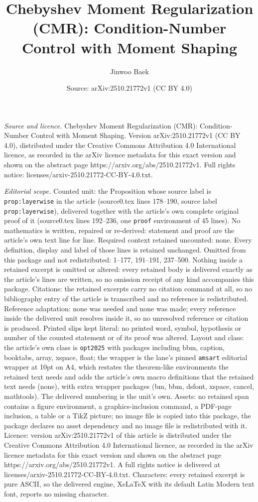 \documentclass[10pt,a4paper]{amsart}
\title[Chebyshev Moment Regularization (CMR): Condition-Number Cont]{Chebyshev Moment Regularization (CMR): Condition-Number Control with Moment Shaping}
\author{Jinwoo Baek}
\date{Source: arXiv:2510.21772v1 (CC BY 4.0)}
\begin{document}
\maketitle

\noindent\emph{Source and licence.} Chebyshev Moment Regularization (CMR): Condition-Number Control with Moment Shaping. Version arXiv:2510.21772v1 (CC BY 4.0), distributed under the Creative Commons Attribution 4.0 International licence, as recorded in the arXiv licence metadata for this exact version and shown on the abstract page https://arxiv.org/abs/2510.21772v1. Full rights notice: licenses/arxiv-2510.21772-CC-BY-4.0.txt.\par\smallskip

\noindent\textit{Editorial scope.} Counted unit: the Proposition whose source label is \texttt{prop:layerwise} in the article (source0.tex lines 178--190, source label \texttt{prop:layerwise}), delivered together with the article's own complete original proof of it (source0.tex lines 192--236, one \texttt{proof} environment of 45 lines). No mathematics is written, repaired or re-derived: statement and proof are the article's own text line for line. Required context retained uncounted: none. Every definition, display and label of those lines is retained unchanged. Omitted from this package and not redistributed: 1--177, 191--191, 237--500. Nothing inside a retained excerpt is omitted or altered: every retained body is delivered exactly as the article's lines are written, so no omission receipt of any kind accompanies this package. Citations: the retained excerpts carry no citation command at all, so no bibliography entry of the article is transcribed and no reference is redistributed. Reference adaptation: none was needed and none was made; every reference inside the delivered unit resolves inside it, so no unresolved reference or citation is produced. Printed slips kept literal: no printed word, symbol, hypothesis or number of the counted statement or of its proof was altered. Layout and class: the article's own class is \texttt{opt2025} with packages including bbm, caption, booktabs, array, xspace, float; the wrapper is the lane's pinned \texttt{amsart} editorial wrapper at 10pt on A4, which restates the theorem-like environments the retained text needs and adds the article's own macro definitions that the retained text needs (none), with extra wrapper packages (bm, bbm, dsfont, xspace, cancel, mathtools). The delivered numbering is the unit's own. Assets: no retained span contains a figure environment, a graphics-inclusion command, a PDF-page inclusion, a table or a TikZ picture; no image file is copied into this package, the package declares no asset dependency and no image file is redistributed with it. Licence: version arXiv:2510.21772v1 of this article is distributed under the Creative Commons Attribution 4.0 International licence, as recorded in the arXiv licence metadata for this exact version and shown on the abstract page https://arxiv.org/abs/2510.21772v1. A full rights notice is delivered at licenses/arxiv-2510.21772-CC-BY-4.0.txt. Characters: every retained excerpt is pure ASCII, so the delivered engine, XeLaTeX with its default Latin Modern text font, reports no missing character.
\end{document}
